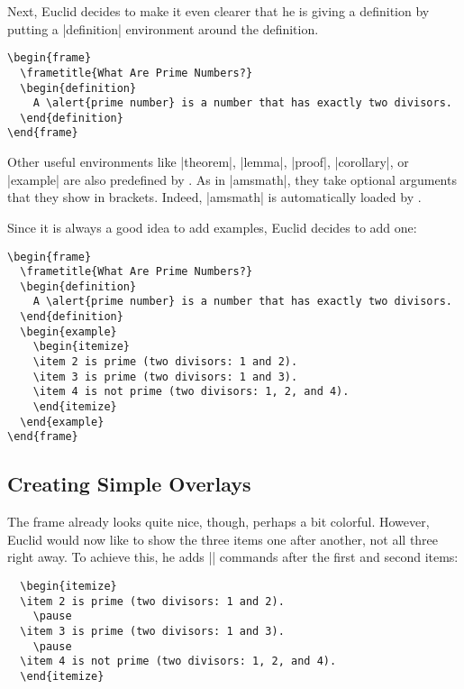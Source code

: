 Next, Euclid decides to make it even clearer that he is giving a
definition by putting a |definition| environment around the
definition. 
\begin{verbatim}
\begin{frame}
  \frametitle{What Are Prime Numbers?}
  \begin{definition}
    A \alert{prime number} is a number that has exactly two divisors.
  \end{definition}
\end{frame}
\end{verbatim}
Other useful environments like |theorem|, |lemma|, |proof|,
|corollary|, or |example| are also predefined by \beamer. As in
|amsmath|, they take optional arguments that they show in
brackets. Indeed, |amsmath| is automatically loaded by \beamer.

Since it is always a good idea to add examples, Euclid decides to add
one:
\begin{verbatim}
\begin{frame}
  \frametitle{What Are Prime Numbers?}
  \begin{definition}
    A \alert{prime number} is a number that has exactly two divisors.
  \end{definition}
  \begin{example}
    \begin{itemize}
    \item 2 is prime (two divisors: 1 and 2).
    \item 3 is prime (two divisors: 1 and 3).
    \item 4 is not prime (two divisors: 1, 2, and 4).
    \end{itemize}
  \end{example}
\end{frame}
\end{verbatim}


\subsection{Creating Simple Overlays}

The frame already looks quite nice, though, perhaps a bit colorful.
However, Euclid would now like to show the three items one after
another, not all three right away. To achieve this, he adds |\pause|
commands after the first and second items:
\begin{verbatim}
  \begin{itemize}
  \item 2 is prime (two divisors: 1 and 2).
    \pause
  \item 3 is prime (two divisors: 1 and 3).
    \pause
  \item 4 is not prime (two divisors: 1, 2, and 4).
  \end{itemize}
\end{verbatim}


